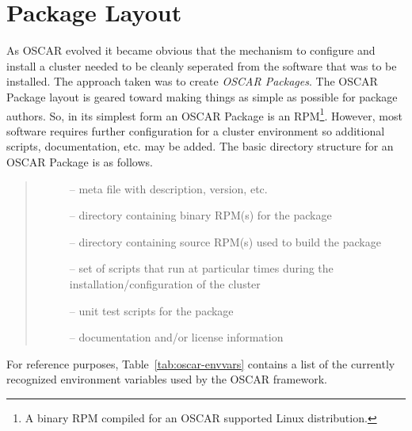 
 
\section{Package Layout}
\label{sect:pkg-layout}

As OSCAR evolved it became obvious that the mechanism to configure and
install a cluster needed to be cleanly seperated from the software that was
to be installed.  The approach taken was to create \emph{OSCAR Packages}.
The OSCAR Package layout is geared toward making things as simple as
possible for package authors.  So, in its simplest form an OSCAR Package is
an RPM\footnote{A binary RPM compiled for an OSCAR supported Linux
distribution.}.  However, most software requires further configuration for
a cluster environment so additional scripts, documentation, etc. may be
added.  The basic directory structure for an OSCAR Package is as follows.

\begin{quote}
\begin{description}
  \item[] -- meta file with description, version, etc.
  \item[] -- directory containing binary RPM(s) for the package
  \item[] -- directory containing source RPM(s) used to build
                            the package
  \item[] --  set of scripts that run at particular times
                     during the installation/configuration of the cluster
  \item[] -- unit test scripts for the package
  \item[] -- documentation and/or license information
\end{description}
\end{quote}

\noindent For reference purposes, Table~\ref{tab:oscar-envvars}
contains a list of the currently recognized environment variables used by
the OSCAR framework.



